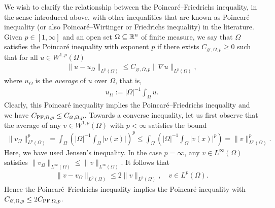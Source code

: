 \documentclass[a4paper]{article}
\begin{document}
We wish to clarify the relationship between the Poincar\'e--Friedrichs inequality, in the sense introduced above, with other inequalities that are known as Poincar\'e inequality (or also Poincar\'e--Wirtinger or Friedrichs inequality) in the literature. Given $p \in [1,\infty]$ and an open set $\Omega \subseteq {\mathbb R}^{n}$ of finite measure, 
we say that $\Omega$ satisfies the Poincar\'e inequality with exponent $p$ 
if there exists $C_{{\varnothing},\Omega,p} \geq 0$ such that 
for all $u \in W^{1,p}(\Omega)$
\begin{align}
    \| u - u_{\Omega} \|_{L^{p}(\Omega)}
    \leq 
    C_{\varnothing,\Omega,p} 
    \| \nabla u \|_{L^{p}(\Omega)}
    ,
\end{align}
where $u_{\Omega}$ is the \emph{average} of $u$ over $\Omega$, that is,
\begin{align*}
    u_{\Omega} := |\Omega|^{-1} \int_{\Omega} u.
\end{align*}
Clearly, this Poincar\'e inequality implies the Poincar\'e--Friedrichs inequality and we have $C_{{\rm{PF}},\Omega,p} \leq C_{\varnothing,\Omega,p}$. 
Towards a converse inequality, 
let us first observe that the average of any $v \in W^{1,p}(\Omega)$ with $p < \infty$ satisfies the bound 
\begin{align*}
    \| v_\Omega \|_{L^{p}(\Omega)}^{p}
    = 
    \int_{\Omega} \left( |\Omega|^{-1} \int_{\Omega} |v(x)| \right)^{p}
    \leq 
    \int_{\Omega} \left( |\Omega|^{-1} \int_{\Omega} |v(x)|^{p} \right)
    = 
    \| v \|_{L^{p}(\Omega)}^{p}
    .
\end{align*}
Here, we have used Jensen's inequality. 
In the case $p = \infty$, any $v \in L^{\infty}(\Omega)$ satisfies $\| v_\Omega \|_{L^{\infty}(\Omega)} \leq \| v \|_{L^{\infty}(\Omega)}$. 
It follows that 
\begin{align*}
    \| v - v_\Omega \|_{L^{p}(\Omega)} 
    \leq
    2
    \| v \|_{L^{p}(\Omega)},
    \quad 
    v \in L^{p}(\Omega)
    .
\end{align*}
Hence the Poincar\'e--Friedrichs inequality implies the Poincar\'e inequality with $C_{\varnothing,\Omega,p} \leq 2 C_{{\rm PF},\Omega,p}$. 
\end{document}

